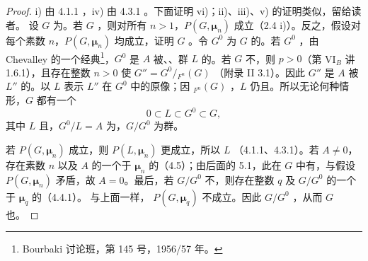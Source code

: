 \begin{proof}
i) 由 4.1.1 ，iv) 由 4.3.1 。下面证明 vi)；ii)、iii)、v) 的证明类似，留给读者。
设 $G$ 为。若 $G$ ，则对所有 $n>1$，$P(G,\boldsymbol\mu_n)$ 成立（2.4 i)）。反之，假设对每个素数 $n$，$P(G,\boldsymbol\mu_n)$ 均成立，证明 $G$ 。令 $G^0$ 为 $G$ 的。若 $G^0$ ，由 Chevalley 的一个经典\footnote{Bourbaki 讨论班，第 145 号，1956/57 年。}，$G^0$ 是 $A$ 被、、群 $L$ 的。若 $G$ 不，则 $p>0$（第 VI$_B$ 讲 1.6.1），且存在整数 $n>0$ 使 $G''=G^0/{}_{F^n}(G)$ （附录 II 3.1）。因此 $G''$ 是 $A$ 被 $L''$ 的。以 $L$ 表示 $L''$ 在 $G^0$ 中的原像；因 ${}_{F^n}(G)$ ，$L$ 仍且。所以无论何种情形，$G$ 都有一个
\[0\subset L\subset G^0\subset G,\]
其中 $L$ 且，$G^0/L=A$ 为，$G/G^0$ 为群。

若 $P(G,\boldsymbol\mu_n)$ 成立，则 $P(L,\boldsymbol\mu_n)$ 更成立，所以 $L$ （4.1.1、4.3.1）。若 $A\ne0$，存在素数 $n$ 以及 $A$ 的一个于 $\boldsymbol\mu_n$ 的（4.5）；由后面的 5.1，此在 $G$ 中有，与假设 $P(G,\boldsymbol\mu_n)$ 矛盾，故 $A=0$。最后，若 $G/G^0$ 不，则存在整数 $q$ 及 $G/G^0$ 的一个于 $\boldsymbol\mu_q$ 的（4.4.1）。
与上面一样， $P(G,\boldsymbol\mu_q)$ 不成立。因此 $G/G^0$ ，从而 $G$ 也。
\end{proof}
